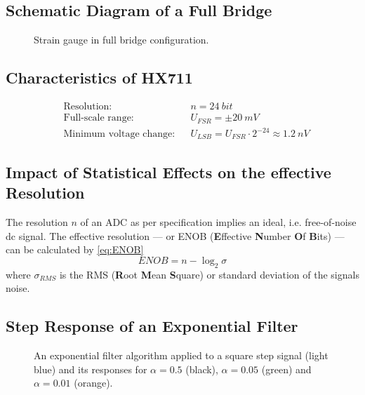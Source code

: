         \subsection{Schematic Diagram of a Full Bridge}\label{sec:A5 schematic diagram full bridge}%
            \begin{figure}[H]
                \centering
                
                \caption[Strain gauge in full bridge configuration]{Strain gauge in full bridge configuration.}
                \label{fig:strain gauge full bridge}
            \end{figure}
        \subsection{Characteristics of HX711}\label{sec:A6 characteristics of the HX711}%
            \begin{align}
                &\text{Resolution:}             &&n = \SI{24}{bit}\\
                &\text{Full-scale range:}       &&U_{FSR} = \pm \SI{20}{mV}\\
                &\text{Minimum voltage change:} &&U_{LSB} = U_{FSR} \cdot 2^{-24} \approx \SI{1.2}{nV}
            \end{align}
        \subsection{Impact of Statistical Effects on the effective Resolution}\label{sec:A7 statistical effects}%
            The resolution \( n \) of an ADC as per specification implies an ideal, i.e. free-of-noise dc signal. The effective resolution —
            or ENOB (\textbf{E}ffective \textbf{N}umber \textbf{O}f \textbf{B}its) — can be calculated by \cref{eq:ENOB}
            \begin{equation}
                ENOB = n - \log_2{\sigma}
                \label{eq:ENOB}
            \end{equation}
            where \( \sigma_{RMS} \) is the RMS (\textbf{R}oot \textbf{M}ean \textbf{S}quare) or standard deviation of the signals noise.
        \subsection{Step Response of an Exponential Filter}\label{sec:A8 step response expo filter}%
            \begin{figure}[H]
                \centering
                
                \caption[Exponential filter applied to square step signal]{An exponential filter algorithm applied to a square step signal (light blue) and its responses
                for \(\alpha = 0.5\) (black), \(\alpha = 0.05\) (green) and \(\alpha = 0.01\) (orange).}
                \label{fig:all step response samples}
            \end{figure}
